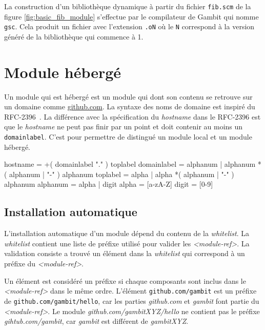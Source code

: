 \vspace{-20pt}
La construction d'un bibliothèque dynamique à partir du fichier \texttt{fib.scm}
de la figure \ref{fig:basic_fib_module} s'effectue par le compilateur de Gambit
qui nomme \texttt{gsc}. Cela produit un fichier avec l'extension \texttt{.oN}
où le \texttt{N} correspond à la version généré de la bibliothèque qui commence à 1.


\section{Module hébergé}

Un module qui est hébergé est un module qui dont son contenu
se retrouve sur un domaine comme \url{github.com}. La syntaxe
des noms de domaine est inspiré du RFC-2396~\cite{RFC:URI-2396}.
La différence avec la spécification du \textit{hostname} dans le RFC-2396
est que le \textit{hostname} ne peut pas finir par un point et doit contenir
au moins un \verb|domainlabel|. C'est pour permettre de distingué
un module local et un module hébergé. \\

\begin{center}
  \begin{mplisting}{0.9}
hostname      = +( domainlabel "." ) toplabel
domainlabel   = alphanum | alphanum *( alphanum | "-" ) alphanum
toplabel      = alpha | alpha *( alphanum | "-" ) alphanum
alphanum      = alpha | digit
alpha         = [a-zA-Z]
digit         = [0-9]
\end{mplisting}
  \label{lst:hostname->grammar}
\end{center}


\subsection{Installation automatique}
%
L'installation automatique d'un module dépend du contenu de la
\textit{whitelist}.  La \textit{whitelist} contient une liste de préfixe
utilisé pour valider les \textit{<module-ref>}. La validation consiste
a trouvé un élément dans la \textit{whitelist} qui correspond à un
préfixe du \textit{<module-ref>}.

Un élément est considéré un préfixe si chaque composants sont inclus dans le
\textit{<module-ref>} dans le même ordre. L'élément \texttt{github.com/gambit}
est un préfixe de \texttt{github.com/gambit/hello}, car les parties
\textit{github.com} et \textit{gambit} font partie du \textit{<module-ref>}. Le
module \textit{github.com/gambitXYZ/hello} ne contient pas le préfixe
\textit{gihtub.com/gambit}, car \textit{gambit} est différent de
\textit{gambitXYZ}.


